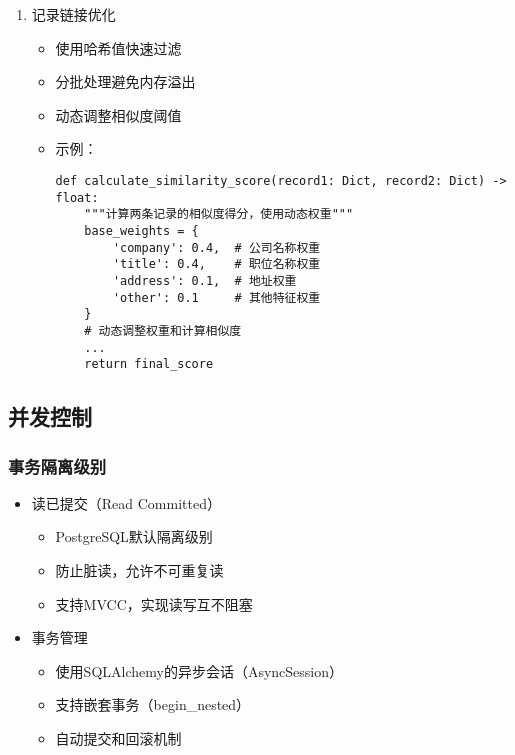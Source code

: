 \begin{enumerate}
  \item 记录链接优化
  \begin{itemize}
    \item 使用哈希值快速过滤
    \item 分批处理避免内存溢出
    \item 动态调整相似度阈值
    \item 示例：
    \begin{verbatim}
def calculate_similarity_score(record1: Dict, record2: Dict) -> float:
    """计算两条记录的相似度得分，使用动态权重"""
    base_weights = {
        'company': 0.4,  # 公司名称权重
        'title': 0.4,    # 职位名称权重
        'address': 0.1,  # 地址权重
        'other': 0.1     # 其他特征权重
    }
    # 动态调整权重和计算相似度
    ...
    return final_score
    \end{verbatim}
  \end{itemize}
\end{enumerate}

\subsection{并发控制}

\subsubsection{事务隔离级别}
\begin{itemize}
  \item 读已提交（Read Committed）
  \begin{itemize}
    \item PostgreSQL默认隔离级别
    \item 防止脏读，允许不可重复读
    \item 支持MVCC，实现读写互不阻塞
  \end{itemize}
  \item 事务管理
  \begin{itemize}
    \item 使用SQLAlchemy的异步会话（AsyncSession）
    \item 支持嵌套事务（begin\_nested）
    \item 自动提交和回滚机制
  \end{itemize}
\end{itemize}

